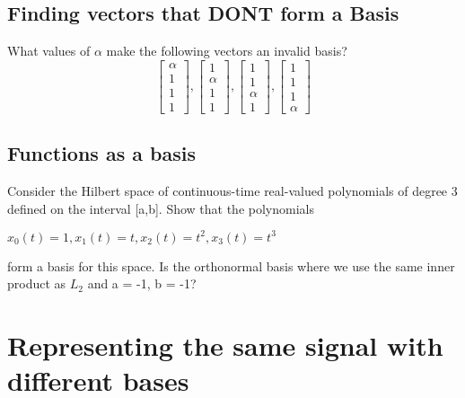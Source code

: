 \documentclass[11pt]{article}
\begin{document}
\subsection{Finding vectors that DONT form a Basis}

What values of $\alpha$ make the following vectors an invalid basis?
\[
\begin{bmatrix}
   \alpha \\
    1      \\
   1       \\
    1   
\end{bmatrix}
,
\begin{bmatrix}
     1 \\
    \alpha   \\
   1       \\
    1   
\end{bmatrix}
,
\begin{bmatrix}
  1 \\
    1      \\
   \alpha    \\
    1   
\end{bmatrix}
,
\begin{bmatrix}
      1 \\
    1      \\
   1       \\
    \alpha  
\end{bmatrix}
\]



\subsection{Functions as a basis}
Consider the Hilbert space of continuous-time real-valued polynomials of degree 3 defined on the interval [a,b]. Show that the polynomials\newline

\begin{center}

$x_0(t) = 1, x_1(t) = t, x_2(t) = t^2, x_3(t) = t^3$

\end{center}

\vspace{3mm}

form a basis for this space. Is the orthonormal basis where we use the same inner product as $L_2$ and a = -1, b = -1?




\section{Representing the same signal with different bases}
\end{document}
